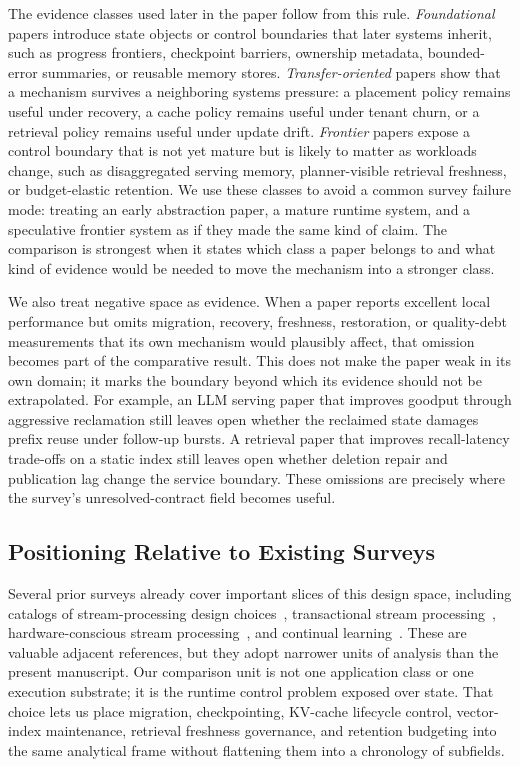 ﻿\documentclass[manuscript]{acmart}
\begin{document}
The evidence classes used later in the paper follow from this rule. \emph{Foundational} papers introduce state objects or control boundaries that later systems inherit, such as progress frontiers, checkpoint barriers, ownership metadata, bounded-error summaries, or reusable memory stores. \emph{Transfer-oriented} papers show that a mechanism survives a neighboring systems pressure: a placement policy remains useful under recovery, a cache policy remains useful under tenant churn, or a retrieval policy remains useful under update drift. \emph{Frontier} papers expose a control boundary that is not yet mature but is likely to matter as workloads change, such as disaggregated serving memory, planner-visible retrieval freshness, or budget-elastic retention. We use these classes to avoid a common survey failure mode: treating an early abstraction paper, a mature runtime system, and a speculative frontier system as if they made the same kind of claim. The comparison is strongest when it states which class a paper belongs to and what kind of evidence would be needed to move the mechanism into a stronger class.

We also treat negative space as evidence. When a paper reports excellent local performance but omits migration, recovery, freshness, restoration, or quality-debt measurements that its own mechanism would plausibly affect, that omission becomes part of the comparative result. This does not make the paper weak in its own domain; it marks the boundary beyond which its evidence should not be extrapolated. For example, an LLM serving paper that improves goodput through aggressive reclamation still leaves open whether the reclaimed state damages prefix reuse under follow-up bursts. A retrieval paper that improves recall-latency trade-offs on a static index still leaves open whether deletion repair and publication lag change the service boundary. These omissions are precisely where the survey's unresolved-contract field becomes useful.

\subsection{Positioning Relative to Existing Surveys}

Several prior surveys already cover important slices of this design space, including catalogs of stream-processing design choices~\cite{hirzel2014catalog,cugola2012processing}, transactional stream processing~\cite{zhang2024survey}, hardware-conscious stream processing~\cite{zhang2020hardware}, and continual learning~\cite{delange2021survey}. These are valuable adjacent references, but they adopt narrower units of analysis than the present manuscript. Our comparison unit is not one application class or one execution substrate; it is the runtime control problem exposed over state. That choice lets us place migration, checkpointing, KV-cache lifecycle control, vector-index maintenance, retrieval freshness governance, and retention budgeting into the same analytical frame without flattening them into a chronology of subfields.
\end{document}
